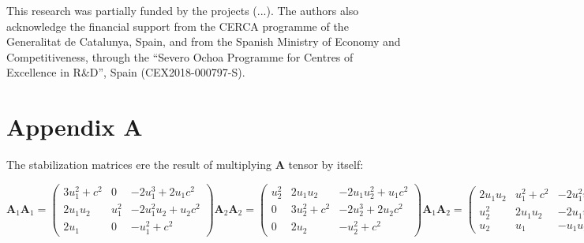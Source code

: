 \documentclass[a4paper,12pt]{article}
\begin{document}
This research was partially funded by the projects (...). The authors also acknowledge the financial support from the CERCA programme of the Generalitat de Catalunya, Spain, and from the Spanish Ministry of Economy and Competitiveness, through the “Severo Ochoa Programme for Centres of Excellence in R\&D”, Spain (CEX2018-000797-S).



\section*{Appendix A}

The stabilization matrices ere the result of multiplying $\mathbf{A}$ tensor by itself:

\begin{subequations}
\begin{equation}
\mathbf{A}_1\mathbf{A}_1 =
\begin{pmatrix}
3u_1^2 + c^2 & 0  & -2u_1^3 + 2u_1c^2 \\
2u_1u_2  & u_1^2  & -2u_1^2u_2 + u_2c^2 \\
2u_1  & 0   & -u_1^2 + c^2
\end{pmatrix}
\end{equation}
\begin{equation}
    \mathbf{A}_2\mathbf{A}_2 =
\begin{pmatrix}
u_2^2  & 2u_1u_2  & -2u_1u_2^2 + u_1c^2 \\
0    & 3u_2^2 + c^2 & -2u_2^3 + 2u_2c^2 \\
0  & 2u_2  & -u_2^2 + c^2
\end{pmatrix}
\end{equation}
\begin{equation}
\mathbf{A}_1\mathbf{A}_2 =
\begin{pmatrix}
2u_1u_2  & u_1^2 + c^2  & -2u_1^2u_2 \\
u_2^2  & 2u_1u_2  & -2u_1u_2^2 + u_1c^2 \\
u_2  & u_1  & -u_1u_2
\end{pmatrix}
\end{equation}
\begin{equation}
\mathbf{A}_2\mathbf{A}_1 =
\begin{pmatrix}
2u_1u_2  & u_1^2  & -2u_1^2u_2 + u_2c^2 \\
u_2^2 + c^2  & 2u_1u_2  & -2u_1u_2^2 \\
u_2  & u_1  & -u_1u_2
\end{pmatrix}
\end{equation}
\end{subequations}




\end{document}
